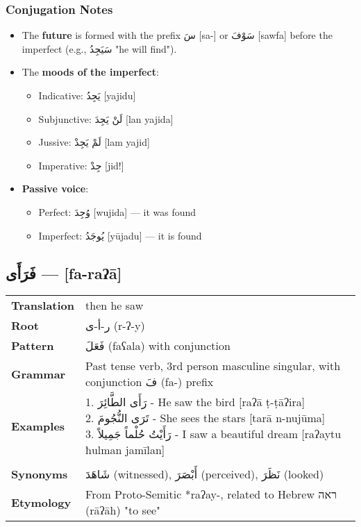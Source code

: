 \documentclass[letterpaper,12pt]{article}
\begin{document}
\subsubsection*{Conjugation Notes}
\begin{itemize}
  \item The \textbf{future} is formed with the prefix \textarabic{سَ} [sa-] or \textarabic{سَوْفَ} [sawfa] before the imperfect (e.g., \textarabic{سَيَجِدُ} "he will find").
  \item The \textbf{moods of the imperfect}: 
    \begin{itemize}
      \item Indicative: \textarabic{يَجِدُ} [yajidu] 
      \item Subjunctive: \textarabic{لَنْ يَجِدَ} [lan yajida]
      \item Jussive: \textarabic{لَمْ يَجِدْ} [lam yajid]
      \item Imperative: \textarabic{جِدْ} [jid!]
    \end{itemize}
  \item \textbf{Passive voice}: 
    \begin{itemize}
      \item Perfect: \textarabic{وُجِدَ} [wujida] — it was found
      \item Imperfect: \textarabic{يُوجَدُ} [yūjadu] — it is found
    \end{itemize}
\end{itemize}

\subsection{\textarabic{فَرَأَى} — [fa-raʔā]}

\begin{tabular}{p{3cm}p{10cm}}
\toprule
\textbf{Translation} & then he saw \\
\textbf{Root} & \textarabic{ر-أ-ى} (r-ʔ-y) \\
\textbf{Pattern} & \textarabic{فَعَلَ} (faʕala) with conjunction \\
\textbf{Grammar} & Past tense verb, 3rd person masculine singular, with conjunction \textarabic{فَ} (fa-) prefix \\
\textbf{Examples} & \makecell[l]{\parbox{9.5cm}{
1. \textarabic{رَأَى الطَّائِرَ} - He saw the bird [raʔā ṭ-ṭāʔira]\\
2. \textarabic{تَرَى النُّجُومَ} - She sees the stars [tarā n-nujūma]\\
3. \textarabic{رَأَيْتُ حُلْماً جَمِيلاً} - I saw a beautiful dream [raʔaytu ħulman jamīlan]
}} \\
\midrule \\
\textbf{Synonyms} & \textarabic{شَاهَدَ} (witnessed), \textarabic{أَبْصَرَ} (perceived), \textarabic{نَظَرَ} (looked) \\
\textbf{Etymology} & From Proto-Semitic *raʔay-, related to Hebrew \texthebrew{ראה} (rāʔāh) "to see" \\
\bottomrule
\end{tabular}
\end{document}
